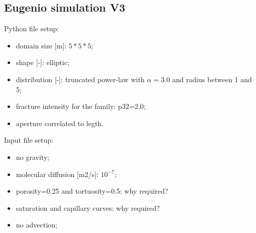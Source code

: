 \documentclass{article}
\begin{document}
\subsection{Eugenio simulation V3}
Python file setup:
\begin{itemize}
    \item domain size [m]: $5*5*5$;
    \item shape [-]: elliptic;
    \item distribution [-]: truncated power-law with $\alpha=3.0$ and radius between 1 and 5;
    \item fracture intensity for the family: p32=2.0;
    \item aperture correlated to legth.
\end{itemize}
Input file setup:
\begin{itemize}
    \item no gravity;
    \item molecular diffusion [m2/s]: $10^{-7}$;
    \item porosity=0.25 and tortuosity=0.5: why required?
    \item saturation and capillary curves: why required?
    \item no advection;
\end{itemize}
\end{document}
